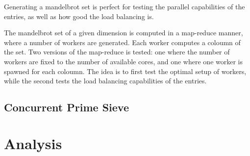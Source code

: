 Generating a mandelbrot set is perfect for testing the parallel capabilities of the entries, as well as how good the load balancing is.

The mandelbrot set of a given dimension is computed in a map\hyp{}reduce manner, where a number of workers are generated. Each worker computes a coloumn of the set. Two versions of the map\hyp{}reduce is tested: one where the number of workers are fixed to the number of available cores, and one where one worker is spawned for each coloumn. The idea is to first test the optimal setup of workers, while the second tests the load balancing capabilities of the entries. 


\subsection{Concurrent Prime Sieve}





\section{Analysis}
\label{sec:analysis}


